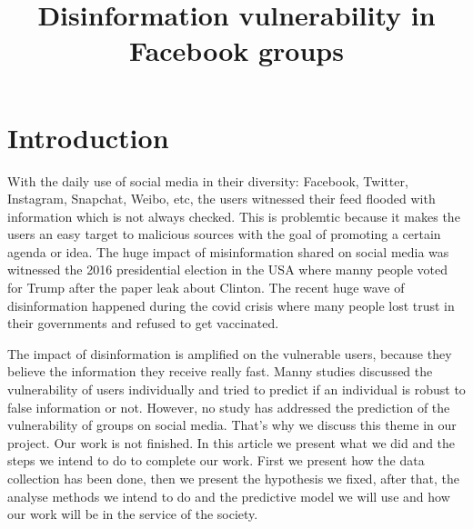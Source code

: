 \documentclass[12pt,sigconf,letterpaper,anonymous,nonacm]{acmart}
\begin{document}
\title{Disinformation vulnerability in Facebook groups}

\maketitle

\section{Introduction}
With the daily use of social media in their diversity: Facebook, Twitter, Instagram, Snapchat, Weibo, etc, the users witnessed their  feed flooded with information which is not always checked. This is problemtic because it makes the users an easy target to malicious sources with the goal of promoting a certain agenda or idea. The huge impact of misinformation shared on social media was witnessed the 2016 presidential election in the USA where manny people voted for Trump after the paper leak about Clinton. The recent huge wave of disinformation happened during the covid crisis where many people lost trust in their governments and refused to get vaccinated.\par
The impact of disinformation is amplified on the vulnerable users, because they believe the information they receive really fast.
Manny studies discussed the vulnerability of users individually and tried to predict if an individual is robust to false information or not. However, no study has addressed the prediction of the vulnerability of groups on social media. That’s why we discuss this theme in our project. Our work is not finished. In this article we present what we did and the steps we intend to do to complete our work. First we present how the data collection has been done, then we present the hypothesis we fixed, after that, the analyse methods we intend to do and the predictive model we will use and how our work will be in  the service of the society.
\end{document}
